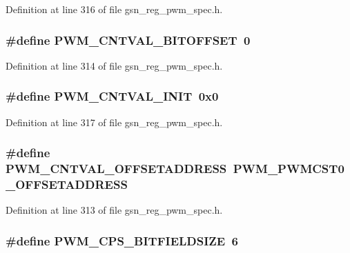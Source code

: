 Definition at line 316 of file gsn\_\-reg\_\-pwm\_\-spec.h.

\hypertarget{a00565_af0a974ea0c7d36049043f7b761ad99a5}{
\subsubsection[{PWM\_\-CNTVAL\_\-BITOFFSET}]{\setlength{\rightskip}{0pt plus 5cm}\#define PWM\_\-CNTVAL\_\-BITOFFSET~0}}
\label{a00565_af0a974ea0c7d36049043f7b761ad99a5}


Definition at line 314 of file gsn\_\-reg\_\-pwm\_\-spec.h.

\hypertarget{a00565_a47135f22788ad7987b7a45e9905f4495}{
\subsubsection[{PWM\_\-CNTVAL\_\-INIT}]{\setlength{\rightskip}{0pt plus 5cm}\#define PWM\_\-CNTVAL\_\-INIT~0x0}}
\label{a00565_a47135f22788ad7987b7a45e9905f4495}


Definition at line 317 of file gsn\_\-reg\_\-pwm\_\-spec.h.

\hypertarget{a00565_a113821db24adeb5e54b06e9f6dc8bdf7}{
\subsubsection[{PWM\_\-CNTVAL\_\-OFFSETADDRESS}]{\setlength{\rightskip}{0pt plus 5cm}\#define PWM\_\-CNTVAL\_\-OFFSETADDRESS~PWM\_\-PWMCST0\_\-OFFSETADDRESS}}
\label{a00565_a113821db24adeb5e54b06e9f6dc8bdf7}


Definition at line 313 of file gsn\_\-reg\_\-pwm\_\-spec.h.

\hypertarget{a00565_aff1828ea2804b30439108c4581c69afe}{
\subsubsection[{PWM\_\-CPS\_\-BITFIELDSIZE}]{\setlength{\rightskip}{0pt plus 5cm}\#define PWM\_\-CPS\_\-BITFIELDSIZE~6}}
\label{a00565_aff1828ea2804b30439108c4581c69afe}


